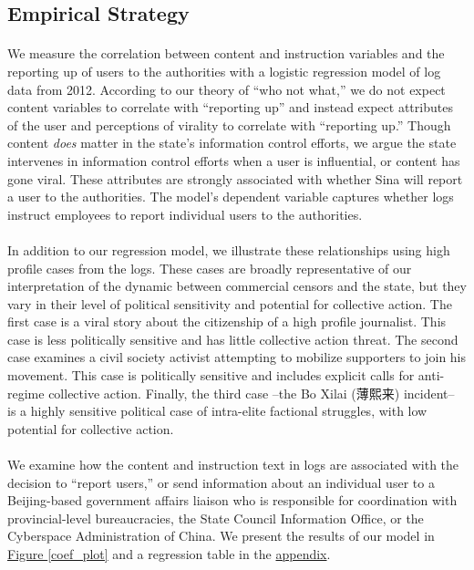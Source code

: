 \documentclass[12pt]{article}
\begin{document}
\begin{CJK*}{UTF8}{gbsn}
\subsection{Empirical Strategy}

\paragraph{} We measure the correlation between content and instruction variables and the reporting up of users to the authorities with a logistic regression model of log data from 2012. According to our theory of ``who not what,'' we do not expect content variables to correlate with ``reporting up'' and instead expect attributes of the user and perceptions of virality to correlate with ``reporting up.'' Though content {\it does} matter in the state's information control efforts, we argue the state intervenes in information control efforts when a user is influential, or content has gone viral. These attributes are strongly associated with whether Sina will report a user to the authorities. The model's dependent variable captures whether logs instruct employees to report individual users to the authorities.

\paragraph{} In addition to our regression model, we illustrate these relationships using high profile cases from the logs. These cases are broadly representative of our interpretation of the dynamic between commercial censors and the state, but they vary in their level of political sensitivity  and potential for collective action. The first case is a viral story about the citizenship of a high profile journalist. This case is less politically sensitive and has little collective action threat. The second case examines a civil society activist attempting to mobilize supporters to join his movement. This case is politically sensitive and includes explicit calls for anti-regime collective action. Finally, the third case --the Bo Xilai (薄熙来) incident-- is a highly sensitive political case of intra-elite factional struggles, with low potential for collective action.

\paragraph{} We examine how the content and instruction text in logs are associated with the decision to ``report users,'' or send information about an individual user to a Beijing-based government affairs liaison who is responsible for coordination with provincial-level bureaucracies, the State Council Information Office, or the Cyberspace Administration of China. We present the results of our model in \hyperref[coef_plot]{Figure \ref*{coef_plot}} and a regression table in the \hyperref[appendix]{appendix}.


\end{CJK*}
\end{document}
